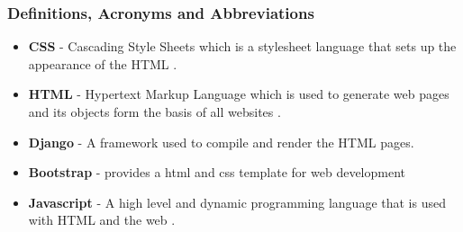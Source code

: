 \documentclass[10pt,twocolumn]{witseiepaper}
\begin{document}
	\subsubsection{Definitions, Acronyms and Abbreviations}
	\begin{itemize}
		\item \textbf{CSS} - Cascading Style Sheets which is a stylesheet language that sets up the appearance of the HTML \cite{CSS}.
		\item \textbf{HTML} - Hypertext Markup Language which is used to generate web pages and its objects form the basis of all websites \cite{HTML}.
		\item \textbf{Django} - A framework used to compile and render the HTML pages.
		\item \textbf{Bootstrap} - provides a html and css template for web development
		\item \textbf{Javascript} - A high level and dynamic programming language that is used with HTML and the web \cite{Javascript}.
	\end{itemize}
	
\end{document}

